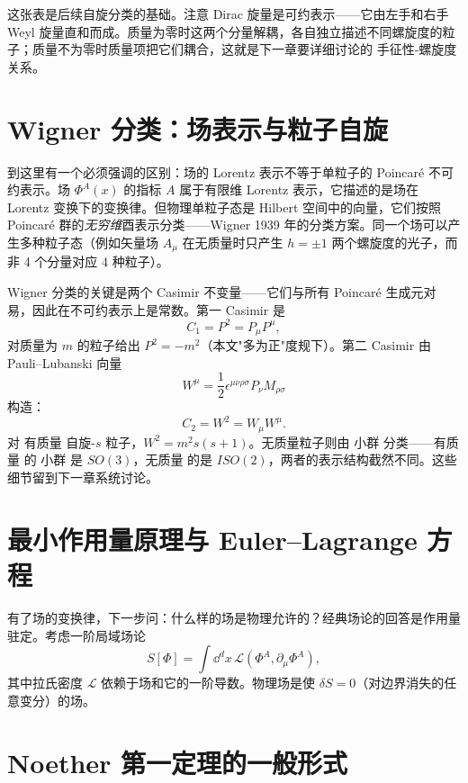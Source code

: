 这张表是后续自旋分类的基础。注意 Dirac 旋量是可约表示——它由左手和右手 Weyl 旋量直和而成。质量为零时这两个分量解耦，各自独立描述不同螺旋度的粒子；质量不为零时质量项把它们耦合，这就是下一章要详细讨论的 手征性-螺旋度 关系。

\section{Wigner 分类：场表示与粒子自旋}

到这里有一个必须强调的区别：场的 Lorentz 表示不等于单粒子的 Poincaré 不可约表示。场 $\Phi^A(x)$ 的指标 $A$ 属于有限维 Lorentz 表示，它描述的是场在 Lorentz 变换下的变换律。但物理单粒子态是 Hilbert 空间中的向量，它们按照 Poincaré 群的\emph{无穷维}酉表示分类——Wigner 1939 年的分类方案。同一个场可以产生多种粒子态（例如矢量场 $A_\mu$ 在无质量时只产生 $h=\pm1$ 两个螺旋度的光子，而非 4 个分量对应 4 种粒子）。

Wigner 分类的关键是两个 Casimir 不变量——它们与所有 Poincaré 生成元对易，因此在不可约表示上是常数。第一 Casimir 是
\begin{equation*}{C_1=P^2=P_\mu P^\mu,}
\end{equation*}
对质量为 $m$ 的粒子给出 $P^2=-m^2$（本文"多为正"度规下）。第二 Casimir 由 Pauli--Lubanski 向量
\begin{equation*}W^\mu=\frac{1}{2}\epsilon^{\mu\nu\rho\sigma}P_\nu M_{\rho\sigma}
\end{equation*}
构造：
\begin{equation*}{C_2=W^2=W_\mu W^\mu.}
\end{equation*}
对 有质量 自旋-$s$ 粒子，$W^2=m^2 s(s+1)$。无质量粒子则由 小群 分类——有质量 的 小群 是 $SO(3)$，无质量 的是 $ISO(2)$，两者的表示结构截然不同。这些细节留到下一章系统讨论。

\section{最小作用量原理与 Euler--Lagrange 方程}

有了场的变换律，下一步问：什么样的场是物理允许的？经典场论的回答是作用量驻定。考虑一阶局域场论
\begin{equation}
S[\Phi]=\int \dd^dx\,\mathcal{L}(\Phi^A,\partial_\mu\Phi^A),
\end{equation}
其中拉氏密度 $\mathcal{L}$ 依赖于场和它的一阶导数。物理场是使 $\delta S=0$（对边界消失的任意变分）的场。

\section{Noether 第一定理的一般形式}

